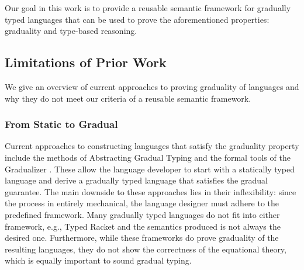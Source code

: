 Our goal in this work is to provide a reusable semantic framework for
gradually typed languages that can be used to prove the aforementioned
properties: graduality and type-based reasoning.

\subsection{Limitations of Prior Work}

We give an overview of current approaches to proving graduality of
languages and why they do not meet our criteria of a reusable semantic
framework.

\subsubsection{From Static to Gradual}

Current approaches to constructing languages that satisfy the
graduality property include the methods of Abstracting Gradual Typing
\cite{garcia-clark-tanter2016} and the formal tools of the Gradualizer
\cite{cimini-siek2016}.  These allow the language developer to start
with a statically typed language and derive a gradually typed language
that satisfies the gradual guarantee. The main downside to these
approaches lies in their inflexibility: since the process in entirely
mechanical, the language designer must adhere to the predefined
framework.  Many gradually typed languages do not fit into either
framework, e.g., Typed Racket \cite{tobin-hochstadt06,
  tobin-hochstadt08} and the semantics produced is not always the
desired one.
%
Furthermore, while these frameworks do prove graduality of the
resulting languages, they do not show the correctness of the
equational theory, which is equally important to sound gradual typing.



